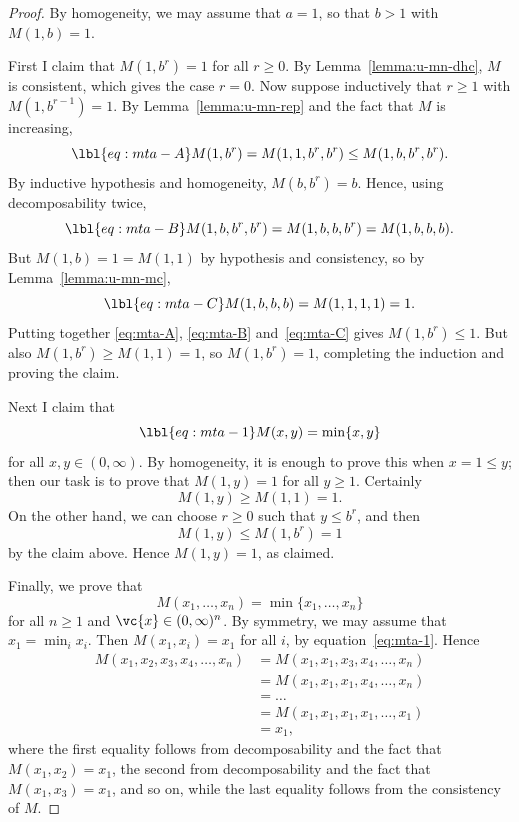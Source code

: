 \begin{proof}
By homogeneity, we may assume that $a = 1$, so that $b > 1$ with $M(1, b) =
1$.

First I claim that $M(1, b^r) = 1$ for all $r \geq 0$.  By
Lemma~\ref{lemma:u-mn-dhc}, $M$ is consistent, which gives the case $r =
0$.  Now suppose inductively that $r \geq 1$ with $M(1, b^{r - 1}) = 1$.
By Lemma~\ref{lemma:u-mn-rep} and the fact that $M$ is increasing,
% 
\begin{equation}
\lbl{eq:mta-A}
M(1, b^r)       
=
M(1, 1, b^r, b^r)   
\leq
M(1, b, b^r, b^r).
\end{equation}
% 
By inductive hypothesis and homogeneity, $M(b, b^r) = b$.  Hence, using
decomposability twice,
% 
\begin{equation}
\lbl{eq:mta-B}
M(1, b, b^r, b^r) = M(1, b, b, b^r) = M(1, b, b, b).
\end{equation}
% 
But $M(1, b) = 1 = M(1, 1)$ by hypothesis and consistency, so by
Lemma~\ref{lemma:u-mn-mc}, 
% 
\begin{equation}
\lbl{eq:mta-C}
M(1, b, b, b) = M(1, 1, 1, 1) = 1.
\end{equation}
% 
Putting together \eqref{eq:mta-A}, \eqref{eq:mta-B} and~\eqref{eq:mta-C}
gives $M(1, b^r) \leq 1$.  But also $M(1, b^r) \geq M(1, 1) = 1$, so 
$M(1, b^r) = 1$, completing the induction and proving the claim.

Next I claim that
% 
\begin{equation}
\lbl{eq:mta-1}
M(x, y) = \min\{x, y\}
\end{equation}
% 
for all $x, y \in (0, \infty)$.  By homogeneity, it is enough to prove this
when $x = 1 \leq y$; then our task is to prove that $M(1, y) = 1$ for all
$y \geq 1$.  Certainly
\[
M(1, y) \geq M(1, 1) = 1.
\]
On the other hand, we can choose $r \geq 0$ such that $y \leq b^r$, and
then
\[
M(1, y) \leq M(1, b^r) = 1
\]
by the claim above.  Hence $M(1, y) = 1$, as claimed.

Finally, we prove that 
\[
M(x_1, \ldots, x_n) = \min\{x_1, \ldots, x_n\}
\]
for all $n \geq 1$ and $\vc{x} \in (0, \infty)^n$.  By symmetry, we may
assume that $x_1 = \min_i x_i$.  Then $M(x_1, x_i) = x_1$ for all $i$, by
equation~\eqref{eq:mta-1}.  Hence
% 
\begin{align*}
M(x_1, x_2, x_3, x_4, \ldots, x_n)     &
=
M(x_1, x_1, x_3, x_4, \ldots, x_n)      \\
&
=
M(x_1, x_1, x_1, x_4, \ldots, x_n)      \\
&
=
\ldots  \\
&
=
M(x_1, x_1, x_1, x_1, \ldots, x_1)      \\
&
=
x_1,
\end{align*}
% 
where the first equality follows from decomposability and the fact that
$M(x_1, x_2) = x_1$, the second from decomposability and the fact that
$M(x_1, x_3) = x_1$, and so on, while the last equality follows from
the consistency of $M$.  
\end{proof}

